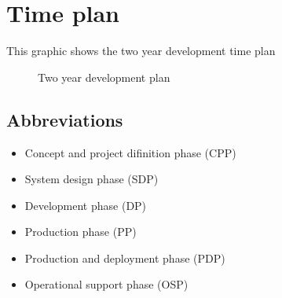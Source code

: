 \documentclass[Main]{subfiles}
\begin{document}
\chapter{Time plan}

This graphic shows the two year development time plan

\begin{figure}[H]


\caption{Two year development plan}
\label{fig:timeplan}

\end{figure}

\section{Abbreviations}

\begin{itemize}

  \item Concept and project difinition phase (CPP)
  \item System design phase (SDP)
  \item Development phase (DP)
  \item Production phase (PP)
  \item Production and deployment phase (PDP)
  \item Operational support phase (OSP)

\end{itemize}
\end{document}
